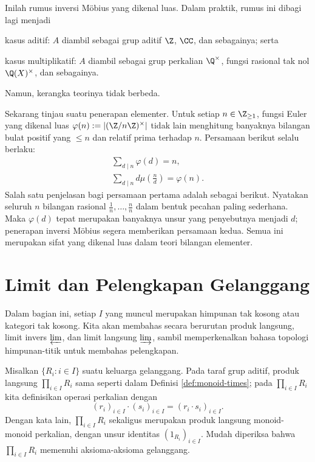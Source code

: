 \begin{example}[A.\ F.\ Möbius, 1832]
	Inilah rumus inversi Möbius yang dikenal luas. Dalam praktik, rumus ini dibagi lagi menjadi
	\begin{inparaenum}[(a)]
		\item kasus aditif: $A$ diambil sebagai grup aditif $\Z$, $\CC$, dan sebagainya; serta
		\item kasus multiplikatif: $A$ diambil sebagai grup perkalian $\Q^\times$, fungsi rasional tak nol $\Q(X)^\times$, dan sebagainya.
	\end{inparaenum}
	Namun, kerangka teorinya tidak berbeda.
\end{example}

Sekarang tinjau suatu penerapan elementer. Untuk setiap $n \in \Z_{\geq 1}$, fungsi Euler yang dikenal luas $\varphi(n) := |(\Z/n\Z)^\times|$ tidak lain menghitung banyaknya bilangan bulat positif yang $\leq n$ dan relatif prima terhadap $n$. Persamaan berikut selalu berlaku:
\begin{equation}\label{eqn:Euler-phi-sum}\begin{gathered}
	\sum_{d \mid n} \varphi(d) = n, \\
	\sum_{d \mid n} d \mu\left( \frac{n}{d} \right) = \varphi(n).
\end{gathered}\end{equation}
Salah satu penjelasan bagi persamaan pertama adalah sebagai berikut. Nyatakan seluruh $n$ bilangan rasional $\frac{1}{n}, \ldots, \frac{n}{n}$ dalam bentuk pecahan paling sederhana. Maka $\varphi(d)$ tepat merupakan banyaknya unsur yang penyebutnya menjadi $d$; penerapan inversi Möbius segera memberikan persamaan kedua. Semua ini merupakan sifat yang dikenal luas dalam teori bilangan elementer.

\section{Limit dan Pelengkapan Gelanggang}\label{sec:ring-limits}
Dalam bagian ini, setiap $I$ yang muncul merupakan himpunan tak kosong atau kategori tak kosong. Kita akan membahas secara berurutan produk langsung, limit invers $\varprojlim$, dan limit langsung $\varinjlim$, sambil memperkenalkan bahasa topologi himpunan-titik untuk membahas pelengkapan.

\begin{definition}\label{def:ring-direct-product}
	Misalkan $\{R_i : i \in I\}$ suatu keluarga gelanggang. Pada taraf grup aditif, produk langsung $\prod_{i \in I} R_i$ sama seperti dalam Definisi \ref{def:monoid-times}; pada $\prod_{i \in I} R_i$ kita definisikan operasi perkalian dengan
	\[ (r_i)_{i \in I} \cdot (s_i)_{i \in I} = (r_i \cdot s_i)_{i \in I}. \]
	Dengan kata lain, $\prod_{i \in I} R_i$ sekaligus merupakan produk langsung monoid-monoid perkalian, dengan unsur identitas $(1_{R_i})_{i \in I}$. Mudah diperiksa bahwa $\prod_{i \in I} R_i$ memenuhi aksioma-aksioma gelanggang.
\end{definition}


